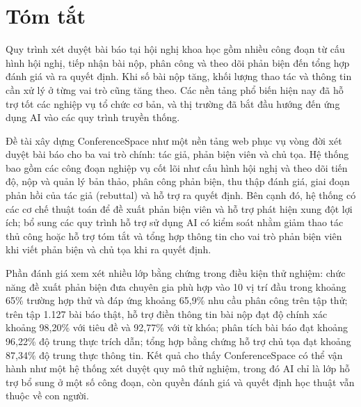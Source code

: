 \chapter*{Tóm tắt}
\label{summary}

Quy trình xét duyệt bài báo tại hội nghị khoa học gồm nhiều công đoạn từ cấu hình hội nghị, tiếp nhận bài nộp, phân công và theo dõi phản biện đến tổng hợp đánh giá và ra quyết định. Khi số bài nộp tăng, khối lượng thao tác và thông tin cần xử lý ở từng vai trò cũng tăng theo. Các nền tảng phổ biến hiện nay đã hỗ trợ tốt các nghiệp vụ tổ chức cơ bản, và thị trường đã bắt đầu hướng đến ứng dụng AI vào các quy trình truyền thống.

Đề tài xây dựng ConferenceSpace như một nền tảng web phục vụ vòng đời xét duyệt bài báo cho ba vai trò chính: tác giả, phản biện viên và chủ tọa. Hệ thống bao gồm các công đoạn nghiệp vụ cốt lõi như cấu hình hội nghị và theo dõi tiến độ, nộp và quản lý bản thảo, phân công phản biện, thu thập đánh giá, giai đoạn phản hồi của tác giả (rebuttal) và hỗ trợ ra quyết định. Bên cạnh đó, hệ thống có các cơ chế thuật toán để đề xuất phản biện viên và hỗ trợ phát hiện xung đột lợi ích; bổ sung các quy trình hỗ trợ sử dụng AI có kiểm soát nhằm giảm thao tác thủ công hoặc hỗ trợ tóm tắt và tổng hợp thông tin cho vai trò phản biện viên khi viết phản biện và chủ tọa khi ra quyết định.

Phần đánh giá xem xét nhiều lớp bằng chứng trong điều kiện thử nghiệm: chức năng đề xuất phản biện đưa chuyên gia phù hợp vào 10 vị trí đầu trong khoảng 65\% trường hợp thử và đáp ứng khoảng 65,9\% nhu cầu phân công trên tập thử; trên tập 1.127 bài báo thật, hỗ trợ điền thông tin bài nộp đạt độ chính xác khoảng 98,20\% với tiêu đề và 92,77\% với từ khóa; phân tích bài báo đạt khoảng 96,22\% độ trung thực trích dẫn; tổng hợp bằng chứng hỗ trợ chủ tọa đạt khoảng 87,34\% độ trung thực thông tin. Kết quả cho thấy ConferenceSpace có thể vận hành như một hệ thống xét duyệt quy mô thử nghiệm, trong đó AI chỉ là lớp hỗ trợ bổ sung ở một số công đoạn, còn quyền đánh giá và quyết định học thuật vẫn thuộc về con người.